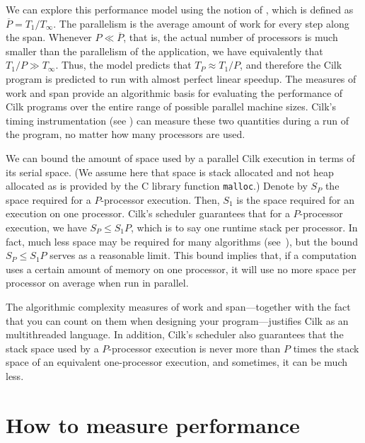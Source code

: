We can explore this performance model using the notion of
, which is defined as $\overline{P}=T_1/T_\infty$.
The parallelism is the average amount of work for every step along the
span.  Whenever $P\ll\overline{P}$, that is, the actual number of
processors is much smaller than the parallelism of the application, we
have equivalently that $T_1/P \gg T_\infty$.  Thus, the model predicts
that $T_P \approx T_1/P$, and therefore the Cilk program is predicted
to run with almost perfect linear speedup.  The measures of work and
span provide an algorithmic basis for evaluating the performance of
Cilk programs over the entire range of possible parallel machine
sizes.  Cilk's timing instrumentation (see ) can
measure these two quantities during a run of the program, no matter
how many processors are used.

We can bound the amount of space used by a parallel Cilk execution in
terms of its serial space.  (We assume here that space is stack
allocated and not heap allocated as is provided by the C library
function \texttt{malloc}.)  Denote by $S_P$ the space required for a
$P$-processor execution.  Then, $S_1$ is the space required for an
execution on one processor.  Cilk's scheduler guarantees that for a
$P$-processor execution, we have $S_P\leq S_1P$, which is to say one
runtime stack per processor.  In fact, much less space may be required
for many algorithms (see~\cite{BlumofeFrJo96b}), but the bound
$S_P\leq S_1P$ serves as a reasonable limit.  This bound implies that,
if a computation uses a certain amount of memory on one processor, it
will use no more space per processor on average when run in parallel.

The algorithmic complexity measures of work and span---together with
the fact that you can count on them when designing your
program---justifies Cilk as an  multithreaded
language.  In addition,
Cilk's scheduler also guarantees that the stack space used by a
$P$-processor execution is never more than $P$ times the stack space
of an equivalent one-processor execution, and sometimes, it can be
much less.\indextim{|)}  

\section{How to measure performance}
\label{sec:perf-meas}

